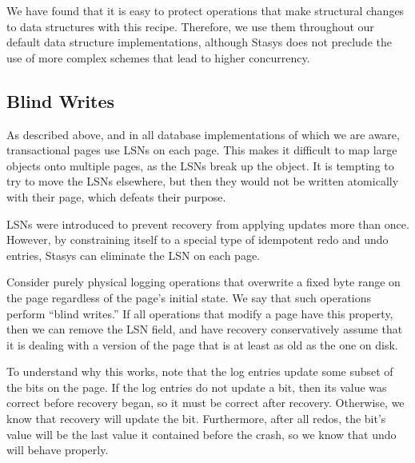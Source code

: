 \documentclass[letterpaper,twocolumn,10pt]{article}
\newcommand{\yad}{Stasys\xspace}
\newcommand{\eat}[1]{}
\begin{document}
We have found that it is easy to protect operations that make
structural changes to data structures with this recipe.
Therefore, we use them throughout our default data structure
implementations, although \yad does not preclude the use of more
complex schemes that lead to higher concurrency.


\subsection{Blind Writes}
\label{sec:blindWrites}
As described above, and in all database implementations of which we
are aware, transactional pages use LSNs on each page.  This makes it
difficult to map large objects onto multiple pages, as the LSNs break
up the object.  It is tempting to try to move the LSNs elsewhere, but
then they would not be written atomically with their page, which
defeats their purpose.

LSNs were introduced to prevent recovery from applying updates more
than once. However, by constraining itself to a special type of idempotent redo and undo
entries,
\yad can eliminate the LSN on each page.

Consider purely physical logging operations that overwrite a fixed
byte range on the page regardless of the page's initial state.  
We say that such operations perform ``blind writes.''
If all
operations that modify a page have this property, then we can remove
the LSN field, and have recovery conservatively assume that it is
dealing with a version of the page that is at least as old as the one
on disk.  

\eat{
This allows non-idempotent operations to be implemented.  For
example, a log entry could simply tell recovery to increment a value
on a page by some value, or to allocate a new record on the page.  
If the recovery algorithm did not know exactly which
version of a page it is dealing with, the operation could
inadvertantly be applied more than once, incrementing the value twice,
or double allocating a record.
}

To understand why this works, note that the log entries
update some subset of the bits on the page.  If the log entries do not
update a bit, then its value was correct before recovery began, so it
must be correct after recovery.  Otherwise, we know that recovery will
update the bit.  Furthermore, after all redos, the bit's value will be the
last value it contained before the crash, so we know that undo will behave
properly.
\end{document}
